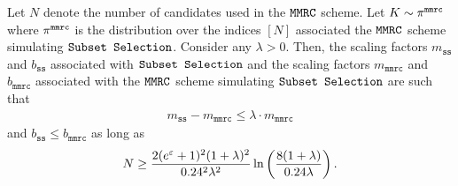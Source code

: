 \begin{lemma}\label{lemma:MMRC_SS_N}
Let $N$ denote the number of candidates used in the \emph{$\texttt{MMRC}$} scheme. Let $K \sim \pi^{\texttt{mmrc}}$ where $\pi^{\texttt{mmrc}}$ is the distribution over the indices $[N]$ associated the \emph{$\texttt{MMRC}$} scheme simulating \emph{$\texttt{Subset Selection}$}. Consider any $\lambda > 0$.
Then, the scaling factors $m_{\texttt{ss}}$ and $b_{\texttt{ss}}$ associated with \emph{$\texttt{Subset Selection}$} and the scaling factors $m_\texttt{mmrc}$ and $b_{\texttt{mmrc}}$ associated with the \emph{$\texttt{MMRC}$} scheme simulating \emph{$\texttt{Subset Selection}$} are such that
\begin{align}
    m_{\texttt{ss}} - m_\texttt{mmrc} \leq \lambda\cdot m_\texttt{mmrc}
\end{align}
and $b_{\texttt{ss}} \leq b_\texttt{mmrc}$
as long as
\begin{align}
    N\geq \frac{2(e^{\varepsilon}+1)^2(1+\lambda)^2}{0.24^2\lambda^2}\ln\left( \frac{8(1+\lambda)}{0.24\lambda}\right).
\end{align}
\end{lemma}

